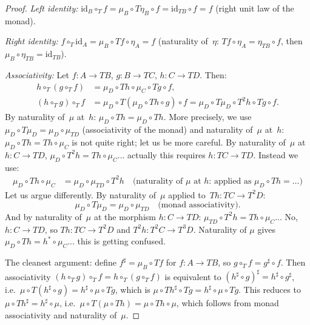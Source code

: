 \documentclass[a4paper,12pt]{book}
\newcommand{\id}{\mathrm{id}}
\theoremstyle{definition}
\theoremstyle{plain}
\theoremstyle{remark}
\begin{document}
\begin{proof}
\textit{Left identity:}
$\id_B\circ_T f = \mu_B\circ T\eta_B\circ f = \id_{TB}\circ f = f$
(right unit law of the monad).

\textit{Right identity:}
$f\circ_T\id_A = \mu_B\circ Tf\circ\eta_A = f$
(naturality of~$\eta$: $Tf\circ\eta_A = \eta_{TB}\circ f$, then
$\mu_B\circ\eta_{TB} = \id_{TB}$).

\textit{Associativity:}
Let $f\colon A\to TB$, $g\colon B\to TC$, $h\colon C\to TD$.  Then:
\begin{align*}
    h\circ_T(g\circ_T f)
    &= \mu_D\circ Th\circ\mu_C\circ Tg\circ f, \\
    (h\circ_T g)\circ_T f
    &= \mu_D\circ T(\mu_D\circ Th\circ g)\circ f
    = \mu_D\circ T\mu_D\circ T^2h\circ Tg\circ f.
\end{align*}
By naturality of~$\mu$ at~$h$: $\mu_D\circ Th = \mu_D\circ Th$.
More precisely, we use $\mu_D\circ T\mu_D = \mu_D\circ\mu_{TD}$
(associativity of the monad) and naturality of~$\mu$ at~$h$:
$\mu_D\circ Th = Th \circ \mu_C$ is not quite right; let us be
more careful.  By naturality of~$\mu$ at $h\colon C\to TD$,
$\mu_D\circ T^2h = Th\circ\mu_C$... actually this requires
$h\colon TC\to TD$.  Instead we use:
\begin{align*}
    \mu_D\circ Th\circ\mu_C
    &= \mu_D\circ\mu_{TD}\circ T^2h \quad\text{(naturality of $\mu$ at $h$: applied as $\mu_D\circ Th = \ldots$)}
\end{align*}
Let us argue differently.  By naturality of~$\mu$ applied to~$Th\colon TC\to T^2D$:
\[
    \mu_D\circ T\mu_D = \mu_D\circ\mu_{TD}
    \quad\text{(monad associativity)}.
\]
And by naturality of~$\mu$ at the morphism $h\colon C\to TD$:
$\mu_{TD}\circ T^2 h = Th\circ\mu_C$... No, $h\colon C\to TD$,
so $Th\colon TC\to T^2D$ and $T^2h\colon T^2C\to T^3D$.
Naturality of $\mu$ gives $\mu_D\circ Th = h^*\circ\mu_C$... this is
getting confused.

The cleanest argument: define $f^{\sharp} = \mu_B\circ Tf$ for
$f\colon A\to TB$, so $g\circ_T f = g^{\sharp}\circ f$.  Then
associativity $(h\circ_T g)\circ_T f = h\circ_T(g\circ_T f)$
is equivalent to $(h^{\sharp}\circ g)^{\sharp} = h^{\sharp}\circ g^{\sharp}$,
i.e.\ $\mu\circ T(h^{\sharp}\circ g) = h^{\sharp}\circ\mu\circ Tg$,
which is $\mu\circ Th^{\sharp}\circ Tg = h^{\sharp}\circ\mu\circ Tg$.
This reduces to $\mu\circ Th^{\sharp} = h^{\sharp}\circ\mu$,
i.e.\ $\mu\circ T(\mu\circ Th) = \mu\circ Th\circ\mu$, which follows
from monad associativity and naturality of~$\mu$.
\end{proof}
\end{document}
